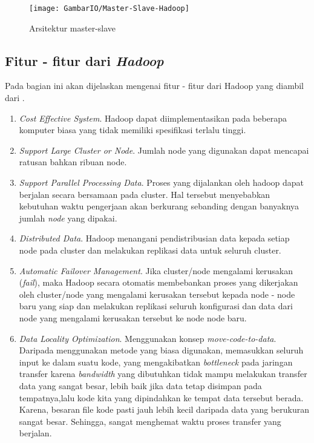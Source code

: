 	\begin{figure}[ht]
			\centering
			\texttt{[image: GambarIO/Master-Slave-Hadoop]}
			\caption[Arsitektur master-slave]{Arsitektur master-slave}
			\label{fig:Arsitektur master-slave}
		\end{figure}
	
	\subsection{Fitur - fitur dari \textit{Hadoop}}
	Pada bagian ini akan dijelaskan mengenai fitur - fitur dari Hadoop yang diambil dari \cite{Lam:2010:HA:1965594}.
	\begin{enumerate}
		\item \textit{Cost Effective System}.
		Hadoop dapat diimplementasikan pada beberapa komputer biasa yang tidak memiliki spesifikasi terlalu tinggi. 
		\item \textit{Support Large Cluster or Node}.
		Jumlah node yang digunakan dapat mencapai ratusan bahkan ribuan node.
		\item \textit{Support Parallel Processing Data}.
		Proses yang dijalankan oleh hadoop dapat berjalan secara bersamaan pada cluster. Hal tersebut menyebabkan kebutuhan waktu pengerjaan akan berkurang sebanding dengan banyaknya jumlah \textit{node} yang dipakai.
		\item \textit{Distributed Data}.
		Hadoop menangani pendistribusian data kepada setiap node pada cluster dan melakukan replikasi data untuk seluruh cluster.
		\item \textit{Automatic Failover Management}.
		Jika cluster/node mengalami kerusakan (\textit{fail}), maka Hadoop secara otomatis membebankan proses yang dikerjakan oleh cluster/node yang mengalami kerusakan tersebut kepada node - node baru yang siap dan melakukan replikasi seluruh konfigurasi dan data dari node yang mengalami kerusakan tersebut ke node node baru.
		\item \textit{Data Locality Optimization}.
		Menggunakan konsep \textit{move-code-to-data}. Daripada menggunakan metode yang biasa digunakan, memasukkan seluruh input ke dalam suatu kode, yang mengakibatkan \textit{bottleneck} pada jaringan transfer karena \textit{bandwidth} yang dibutuhkan tidak mampu melakukan transfer data yang sangat besar, lebih baik jika data tetap disimpan pada tempatnya,lalu kode kita yang dipindahkan ke tempat data tersebut berada. Karena, besaran file kode pasti jauh lebih kecil daripada data yang berukuran sangat besar. Sehingga, sangat menghemat waktu proses transfer yang berjalan.

\end{enumerate}
